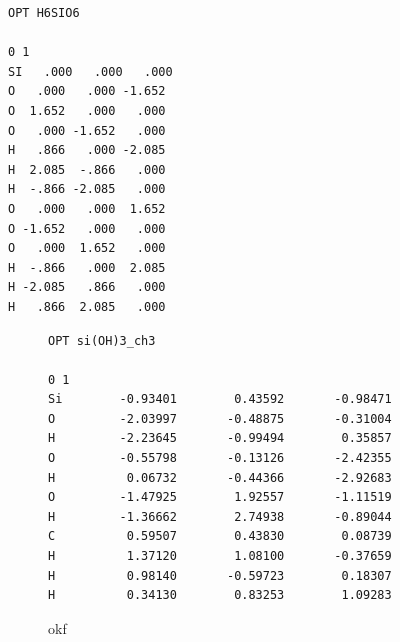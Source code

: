 \documentclass[
  digital, %
  table,   %
  lof,     %
  lot,     %
]{fithesis3}
\begin{document}
 \begin{verbatim}
OPT H6SIO6 

0 1
SI   .000   .000   .000  
O   .000   .000 -1.652 
O  1.652   .000   .000 
O   .000 -1.652   .000 
H   .866   .000 -2.085 
H  2.085  -.866   .000 
H  -.866 -2.085   .000 
O   .000   .000  1.652 
O -1.652   .000   .000 
O   .000  1.652   .000 
H  -.866   .000  2.085 
H -2.085   .866   .000 
H   .866  2.085   .000
 \end{verbatim}
\begin{figure}

\begin{verbatim}
OPT si(OH)3_ch3

0 1
Si        -0.93401        0.43592       -0.98471
O         -2.03997       -0.48875       -0.31004
H         -2.23645       -0.99494        0.35857
O         -0.55798       -0.13126       -2.42355
H          0.06732       -0.44366       -2.92683
O         -1.47925        1.92557       -1.11519
H         -1.36662        2.74938       -0.89044
C          0.59507        0.43830        0.08739
H          1.37120        1.08100       -0.37659
H          0.98140       -0.59723        0.18307
H          0.34130        0.83253        1.09283
\end{verbatim}
\caption{okf}
\end{figure}
\end{document}
